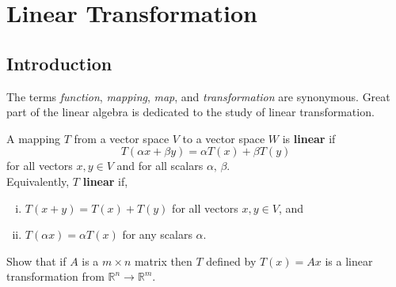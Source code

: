 \documentclass[aima104_lecturenotes_ku.tex]{subfiles}
\begin{document}
\chapter{Linear Transformation}
\section{Introduction}
The terms \textit{function}, \textit{mapping}, \textit{map}, and \textit{transformation} are synonymous. Great part of the linear algebra is dedicated to the study of linear transformation.

\begin{mdframed}
    \begin{definition}
      A mapping $T$ from a vector space $V$ to a vector space $W$ is \textbf{linear} if $$T(\alpha x +\beta y) = \alpha T(x) + \beta T(y)$$ for all vectors $x, y \in V$ and for all scalars $\alpha,\, \beta$. \\[1mm]
      Equivalently, $T$ \textbf{linear} if,
      \begin{enumerate}[i)]
      \item $T(x + y) = T(x) + T(y)$ for all vectors $x, y \in V$, and
        \item $T(\alpha x) = \alpha T(x)$ for any scalars $\alpha$.
        \end{enumerate}
    \end{definition}
\end{mdframed}
\begin{example}
  Show that if $A$ is a $m \times n$ matrix then $T$ defined by $T(x)=Ax$ is a linear transformation from $\mathbb{R} ^n \to \mathbb{R} ^m$.
\end{example}
\end{document}
